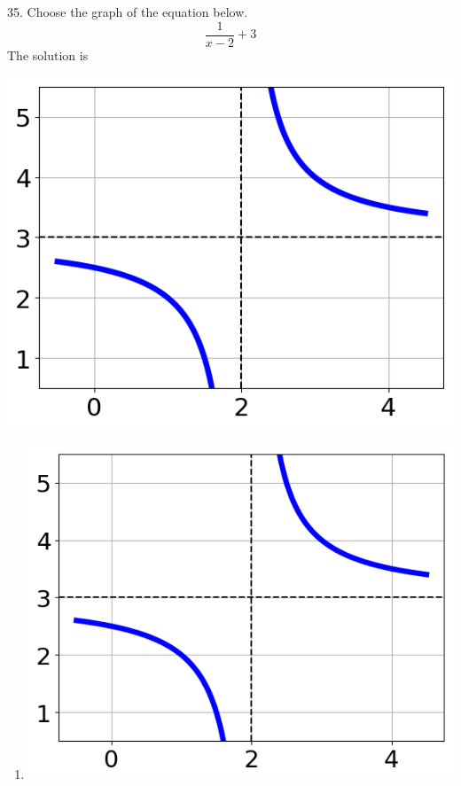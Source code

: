 \documentclass{article}[10pt]
\begin{document}
35. Choose the graph of the equation below.
$$ \frac{1}{x - 2} + 3 $$ 
The solution is  
\begin{center}\includegraphics[scale=0.5]{../Figures/question35MUC.png}\end{center}\begin{enumerate}[label=\Alph*.] 
\item  
\begin{center}\includegraphics[scale=0.5]{../Figures/question35MUC.png}\end{center} 
 

\end{enumerate}
\end{document}
